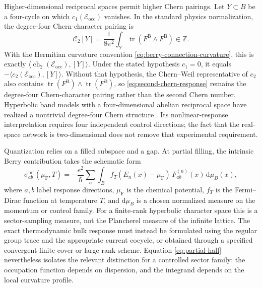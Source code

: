 \documentclass[11pt]{article}
\theoremstyle{definition}
\theoremstyle{remark}
\newcommand{\ZZ}{\mathbb Z}
\newcommand{\tr}{\operatorname{tr}}
\newcommand{\ch}{\operatorname{ch}}
\newcommand{\dd}{\mathrm d}
\begin{document}
Higher-dimensional reciprocal spaces permit higher Chern pairings.  Let
\(Y\subset B\) be a four-cycle on which
\(c_1(\mathscr E_{\mathrm{occ}})\) vanishes.  In the standard physics
normalization, the degree-four Chern-character pairing is
\[
       \mathcal C_2[Y]
         =\frac{1}{8\pi^2}
            \int_Y\tr(F^{\mathrm B}\wedge F^{\mathrm B})\in\ZZ .
         \tag{8.3}\label{eq:second-chern-response}
\]
With the Hermitian curvature convention
\eqref{eq:berry-connection-curvature}, this is exactly
\(\langle\ch_2(\mathscr E_{\mathrm{occ}}),[Y]\rangle\).  Under the stated
hypothesis \(c_1=0\), it equals
\(-\langle c_2(\mathscr E_{\mathrm{occ}}),[Y]\rangle\).  Without that
hypothesis, the Chern--Weil representative of \(c_2\) also contains
\(\tr(F^{\mathrm B})\wedge\tr(F^{\mathrm B})\), so
\eqref{eq:second-chern-response} remains the degree-four Chern-character
pairing rather than the second Chern number.
Hyperbolic band models with a four-dimensional abelian reciprocal space have
realized a nontrivial degree-four Chern structure
\cite{ZhangEtAlSecondChern,TummuruEtAl2024}.  Its nonlinear-response
interpretation requires four independent control directions; the fact that
the real-space network is two-dimensional does not remove that experimental
requirement.

Quantization relies on a filled subspace and a gap.  At partial filling, the
intrinsic Berry contribution takes the schematic form
\[
 \sigma_{ab}^{\mathrm{int}}(\mu_{\mathrm F},T)
   =-\frac{e^2}{\hbar}
      \sum_n\int_B
       f_T(E_n(x)-\mu_{\mathrm F})\,F_{ab}^{(n)}(x)\,
       \dd\mu_B(x),
 \tag{8.4}\label{eq:partial-hall}
\]
where \(a,b\) label response directions, \(\mu_{\mathrm F}\) is the chemical
potential, \(f_T\) is the Fermi--Dirac function at temperature \(T\), and
\(\dd\mu_B\) is a chosen normalized measure on the momentum or control family.
For a finite-rank hyperbolic character space this is a sector-sampling
measure, not the Plancherel measure of the infinite lattice.  The exact
thermodynamic bulk response must instead be formulated using the regular
group trace and the appropriate current cocycle, or obtained through a
specified convergent finite-cover or large-rank scheme.  Equation
\eqref{eq:partial-hall} nevertheless isolates the relevant distinction for a
controlled sector family: the occupation function depends on dispersion, and
the integrand depends on the local curvature profile.
\end{document}
